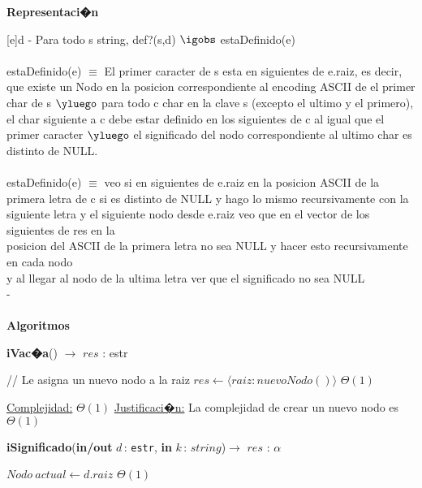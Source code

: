 \documentclass[a4paper,10pt]{article}
\let\TipoVariable=\texttt
\let\ModificadorArgumento=\textbf
\newcommand{\tab}{\hspace*{7mm}}
\newcommand{\In}[2]{\ModificadorArgumento{in} \ensuremath{#1}\,: \TipoVariable{#2}\xspace}
\newcommand{\Inout}[2]{\ModificadorArgumento{in/out} \ensuremath{#1}\,: \TipoVariable{#2}\xspace}
\newenvironment{Representacion}{%
  \vspace*{2ex}%
  \noindent\textbf{\Large Representaci�n}%
  \vspace*{2ex}%
}{}
\newenvironment{Algoritmos}{%
  \vspace*{2ex}%
  \noindent\textbf{\Large Algoritmos}%
  \vspace*{2ex}%
}{}
\newcommand{\tuple}[1]{\langle #1 \rangle}
\begin{document}
{\begin{Representacion}
    [e]{d}{
      - Para todo s string, def?(s,d) $\igobs$ estaDefinido(e) 
     \\ \\ \tab estaDefinido(e) $\equiv$ El primer caracter de s esta en siguientes de e.raiz, es decir, que existe un Nodo en la posicion correspondiente al encoding ASCII de el primer char de s $\yluego$ para todo c char en la clave s (excepto el ultimo y el primero), el char siguiente a c debe estar definido en los siguientes de c al igual que el primer caracter $\yluego$ el significado del nodo correspondiente al ultimo char es distinto de NULL.
      \\ \\ \tab estaDefinido(e) $\equiv$ veo si en siguientes de e.raiz en la posicion ASCII de la primera letra de c
      si es distinto de NULL y hago lo mismo recursivamente con la siguiente letra y el siguiente nodo 
      desde e.raiz veo que en el vector de los siguientes de res en la 
      \\ \tab posicion del ASCII de la primera letra no sea NULL y hacer esto recursivamente en cada nodo
      \\ \tab y al llegar al nodo de la ultima letra ver que el significado no sea NULL
      \\ - }
      \\ \\
  \end{Representacion}
  \begin{Algoritmos}

    \begin{algorithm}[H]{\textbf{iVac�a}() $\to$ $res$ : estr}
      \begin{algorithmic}[1]
           \State // Le asigna un nuevo nodo a la raiz
           \State $res \gets \tuple{raiz: nuevoNodo()}$				\Comment $\Theta(1)$
    
          \medskip
          \Statex \underline{Complejidad:} $\Theta(1)$
          \Statex \underline{Justificaci�n:} La complejidad de crear un nuevo nodo es $\Theta(1)$
          \end{algorithmic}
    \end{algorithm}

    \begin{algorithm}[H]{\textbf{iSignificado}(\Inout{d}{estr}, \In{k}{$string$})$\to$ $res$ : $\alpha$}
      \begin{algorithmic}[1]
        \State $Nodo \ actual \gets d.raiz$                                                      \Comment $\Theta(1)$


\end{algorithmic}
\end{algorithm}
\end{Algoritmos}}
\end{document}
